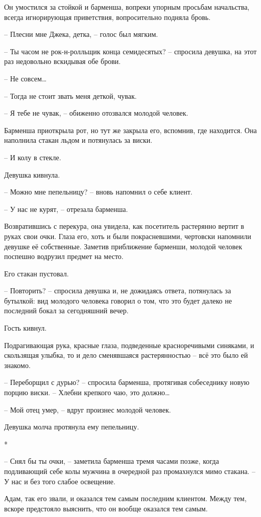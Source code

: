 \documentclass[
  a5paperpaper,
  DIV=11,
  numbers=noendperiod]{scrreprt}
\begin{document}
Он умостился за стойкой и барменша, вопреки упорным просьбам начальства,
всегда игнорирующая приветствия, вопросительно подняла бровь.

-- Плесни мне Джека, детка, -- голос был мягким.

-- Ты часом не рок-н-ролльщик конца семидесятых? -- спросила девушка, на
этот раз недовольно вскидывая обе брови.

-- Не совсем\ldots{}

-- Тогда не стоит звать меня деткой, чувак.

-- Я тебе не чувак, -- обиженно отозвался молодой человек.

Барменша приоткрыла рот, но тут же закрыла его, вспомнив, где находится.
Она наполнила стакан льдом и потянулась за виски.

-- И колу в стекле.

Девушка кивнула.

-- Можно мне пепельницу? -- вновь напомнил о себе клиент.

-- У нас не курят, -- отрезала барменша.

Возвратившись с перекура, она увидела, как посетитель растерянно вертит
в руках свои очки. Глаза его, хоть и были покрасневшими, чертовски
напомнили девушке её собственные. Заметив приближение барменши, молодой
человек поспешно водрузил предмет на место.

Его стакан пустовал.

-- Повторить? -- спросила девушка и, не дожидаясь ответа, потянулась за
бутылкой: вид молодого человека говорил о том, что это будет далеко не
последний бокал за сегодняшний вечер.

Гость кивнул.

Подрагивающая рука, красные глаза, подведенные красноречивыми синяками,
и скользящая улыбка, то и дело сменявшаяся растерянностью -- всё это
было ей знакомо.

-- Переборщил с дурью? -- спросила барменша, протягивая собеседнику
новую порцию виски. -- Хлебни крепкого чаю, это должно\ldots{}

-- Мой отец умер, -- вдруг произнес молодой человек.

Девушка молча протянула ему пепельницу.

*

-- Снял бы ты очки, -- заметила барменша тремя часами позже, когда
подливающий себе колы мужчина в очередной раз промахнулся мимо стакана.
-- У нас и без того слабое освещение.

Адам, так его звали, и оказался тем самым последним клиентом. Между тем,
вскоре предстояло выяснить, что он вообще оказался тем самым.
\end{document}
